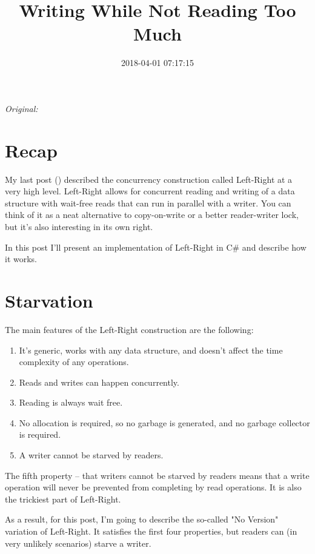 \documentclass[11pt]{article}
\begin{document}
\title{Writing While Not Reading Too Much}
\date{2018-04-01 07:17:15}
\maketitle

\noindent\textit{Original: }\texttt{}\par
\medskip
\section{Recap}

My last post (\texttt{}) described the concurrency construction called Left-Right at a very high level. Left-Right allows for concurrent reading and writing of a data structure with wait-free reads that can run in parallel with a writer. You can think of it as a neat alternative to copy-on-write or a better reader-writer lock, but it's also interesting in its own right.

In this post I'll present an implementation of Left-Right in C\# and describe how it works.
\section{Starvation}

The main features of the Left-Right construction are the following:
\begin{enumerate}
\item It's generic, works with any data structure, and doesn't affect the time complexity of any operations.
\item Reads and writes can happen concurrently.
\item Reading is always wait free.
\item No allocation is required, so no garbage is generated, and no garbage collector is required.
\item A writer cannot be starved by readers.
\end{enumerate}

The fifth property -- that writers cannot be starved by readers means that a write operation will never be prevented from completing by read operations. It is also the trickiest part of Left-Right.

As a result, for this post, I'm going to describe the so-called "No Version" variation of Left-Right. It satisfies the first four properties, but readers can (in very unlikely scenarios) starve a writer.
\end{document}
